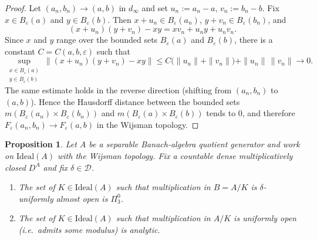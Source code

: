 \documentclass[12pt,fleqn,a4paper]{amsart}
\renewcommand{\le}{\leqslant}
\numberwithin{equation}{section}
\newtheorem{proposition}[theorem]{Proposition}
\theoremstyle{definition}
\newcommand{\Ideal}{\mathrm{Ideal}}
\begin{document}
\begin{proof}
Let $(a_n,b_n)\to(a,b)$ in $d_\infty$ and set $u_n:=a_n-a$, $v_n:=b_n-b$.
Fix $x\in B_\varepsilon(a)$ and $y\in B_\varepsilon(b)$. Then
$x+u_n\in B_\varepsilon(a_n)$, $y+v_n\in B_\varepsilon(b_n)$, and
\[
(x+u_n)(y+v_n)-xy = x v_n + u_n y + u_n v_n.
\]
Since $x$ and $y$ range over the bounded sets $B_\varepsilon(a)$ and $B_\varepsilon(b)$,
there is a constant $C=C(a,b,\varepsilon)$ such that
\[
\sup_{\substack{x\in B_\varepsilon(a)\\y\in B_\varepsilon(b)}}
\|(x+u_n)(y+v_n)-xy\|
\le C\bigl(\|u_n\|+\|v_n\|\bigr)+\|u_n\|\,\|v_n\|\to 0.
\]
The same estimate holds in the reverse direction (shifting from $(a_n,b_n)$ to $(a,b)$).
Hence the Hausdorff distance between the bounded sets
$m(B_\varepsilon(a_n)\times B_\varepsilon(b_n))$ and
$m(B_\varepsilon(a)\times B_\varepsilon(b))$
tends to $0$, and therefore $F_\varepsilon(a_n,b_n)\to F_\varepsilon(a,b)$
in the Wijsman topology.
\end{proof}

\begin{proposition}\label{prop:UO}
Let $A$ be a separable Banach-algebra quotient generator and work on $\Ideal(A)$
with the Wijsman topology. Fix a countable dense multiplicatively closed $D^A$ and fix
$\delta\in\mathcal D$.

\begin{enumerate}
\item The set of $K\in\Ideal(A)$ such that multiplication in $B=A/K$ is
$\delta$-uniformly almost open is $\Pi^0_3$.

\item The set of $K\in\Ideal(A)$ such that multiplication in $A/K$ is
uniformly open (\emph{i.e.}\ admits some modulus) is analytic.
\end{enumerate}
\end{proposition}
\end{document}
